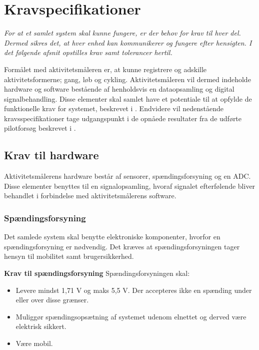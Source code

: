 \section{Kravspecifikationer}
\textit{For at et samlet system skal kunne fungere, er der behov for krav til hver del. Dermed sikres det, at hver enhed kan kommunikerer og fungere efter hensigten. I det følgende afsnit opstilles krav samt tolerancer hertil.}

Formålet med aktivitetsmåleren er, at kunne registrere og adskille aktivitetsformerne; gang, løb og cykling. Aktivitetsmåleren vil dermed indeholde hardware og software bestående af henholdsvis en dataopsamling og digital signalbehandling. Disse elementer skal samlet have et potentiale til at opfylde de funktionelle krav for systemet, beskrevet i . Endvidere vil nedenstående kravsspecifikationer tage udgangspunkt i de opnåede resultater fra de udførte pilotforsøg beskrevet i .

\subsection{Krav til hardware}
Aktivitetsmålerens hardware består af sensorer, spændingsforsyning og en ADC. Disse elementer benyttes til en signalopsamling, hvoraf signalet efterfølende bliver behandlet i forbindelse med aktivitetsmålerens software.

\subsubsection{Spændingsforsyning}
Det samlede system skal benytte elektroniske komponenter, hvorfor en spændingsforsyning er nødvendig. Det kræves at spændingsforsyningen tager hensyn til mobilitet samt brugersikkerhed.

\textbf{Krav til spændingsforsyning} \newline 
Spændingsforsyningen skal:
\begin{itemize}
	\item Levere mindst 1,71 V og maks 5,5 V. Der accepteres ikke en spænding under eller over disse grænser. %
	\item Muliggør spændingsopsætning af systemet udenom elnettet og derved være elektrisk sikkert.
	\item Være mobil.
\end{itemize}

